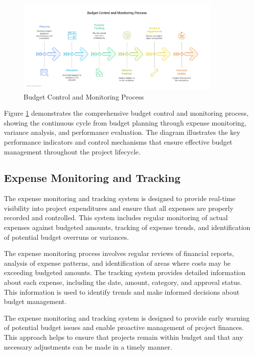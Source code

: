 \begin{figure}[H]
    \centering
    \includegraphics[width=0.9\textwidth]{assets/images/budget_control.png}
    \caption{Budget Control and Monitoring Process}
    \label{fig:budget_control}
\end{figure}

Figure \ref{fig:budget_control} demonstrates the comprehensive budget control and monitoring process, showing the continuous cycle from budget planning through expense monitoring, variance analysis, and performance evaluation. The diagram illustrates the key performance indicators and control mechanisms that ensure effective budget management throughout the project lifecycle.

\subsection{Expense Monitoring and Tracking}
The expense monitoring and tracking system is designed to provide real-time visibility into project expenditures and ensure that all expenses are properly recorded and controlled. This system includes regular monitoring of actual expenses against budgeted amounts, tracking of expense trends, and identification of potential budget overruns or variances.

The expense monitoring process involves regular reviews of financial reports, analysis of expense patterns, and identification of areas where costs may be exceeding budgeted amounts. The tracking system provides detailed information about each expense, including the date, amount, category, and approval status. This information is used to identify trends and make informed decisions about budget management.

The expense monitoring and tracking system is designed to provide early warning of potential budget issues and enable proactive management of project finances. This approach helps to ensure that projects remain within budget and that any necessary adjustments can be made in a timely manner.

